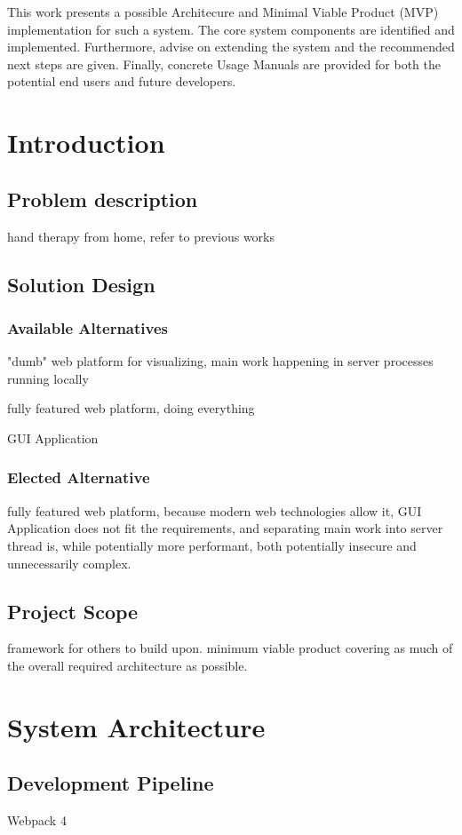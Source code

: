 \documentclass[fontsize=12pt,a4paper,draft]{scrartcl}[2018/05/07]
\begin{document}
This work presents a possible Architecure and Minimal Viable Product (MVP) implementation for such a system. The core system components are identified and implemented. Furthermore, advise on extending the system and the recommended next steps are given. Finally, concrete Usage Manuals are provided for both the potential end users and future developers.

\section{Introduction}
\subsection{Problem description}
hand therapy from home, refer to previous works
\subsection{Solution Design}
\subsubsection{Available Alternatives}
"dumb" web platform for visualizing, main work happening in server processes running locally

fully featured web platform, doing everything

GUI Application
\subsubsection{Elected Alternative}
fully featured web platform, because modern web technologies allow it, GUI Application does not fit the requirements, and separating main work into server thread is, while potentially more performant, both potentially insecure and unnecessarily complex.
\subsection{Project Scope}
framework for others to build upon. minimum viable product covering as much of the overall required architecture as possible.

\section{System Architecture}
\subsection{Development Pipeline}
Webpack 4
\end{document}
